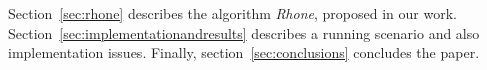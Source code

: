 
Section~\ref{sec:rhone} describes the algorithm \textit{Rhone}, proposed in our
work. Section~\ref{sec:implementationandresults} describes a running scenario
and also implementation issues.
Finally, section~\ref{sec:conclusions} concludes the paper.
